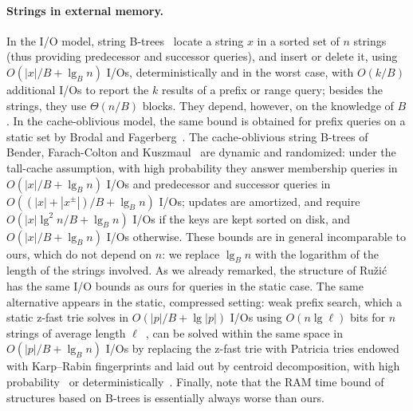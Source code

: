 \documentclass[a4paper]{article}
\newcommand{\?}{\mskip1.5mu}
\begin{document}
\paragraph{Strings in external memory.} In the I/O model, string B-trees~\cite{FeGSBT} locate a string $x$ in a sorted set of $n$ strings
(thus providing predecessor and successor queries), and insert or delete it, using
$O(|x|/B+\lg_B n)$ I/Os, deterministically and in the worst case, with $O(k/B)$ additional I/Os to report the $k$ results of a prefix or range query; 
besides the strings, they use $\Theta(n/B)$ blocks. They depend, however, on the knowledge of $B$. In the cache-oblivious model, the same bound is obtained for prefix queries on a static set
by Brodal and Fagerberg~\cite{Brodal2006Cacheoblivious}. The cache-oblivious string B-trees of
Bender, Farach-Colton and Kuszmaul~\cite{Bender2006Cacheoblivious} are dynamic and randomized: under the tall-cache
assumption, with high probability they answer membership queries in $O(|x|/B+\lg_B n)$ I/Os and predecessor and successor
queries in $O((|x|+|x^\pm|)/B+\lg_B n)$ I/Os; updates are amortized, and require $O(|x|\lg^2 n/B+\lg_B n)$ I/Os
if the keys are kept sorted on disk, and $O(|x|/B+\lg_B n)$ I/Os otherwise. 
These bounds are in general incomparable to ours, which do not depend on $n$: we replace $\lg_B n$ with the logarithm of the length of the strings involved. 
As we already remarked, the structure of Ru\v{z}i\'c~\cite{Ruzic2009Making} has the same I/O bounds as ours for queries in the static case.
The same alternative appears in the static, compressed setting: weak prefix search, 
which a static z-fast trie solves in $O(|p|/B+\lg|p|)$ I/Os using $O(n\lg\ell)$ bits for $n$ strings of 
average length $\ell$~\cite{Belazzougui2010Fast}, can be solved within the same space in $O(|p|/B+\lg_B n)$ I/Os 
by replacing the z-fast trie with Patricia tries endowed with Karp--Rabin fingerprints and laid out by centroid decomposition, 
with high probability~\cite{Ferragina2013Weak} or deterministically~\cite{Ferragina2016Compressed}. 
Finally, note
that the RAM time bound of structures based on B-trees is essentially always worse than ours.
\end{document}
